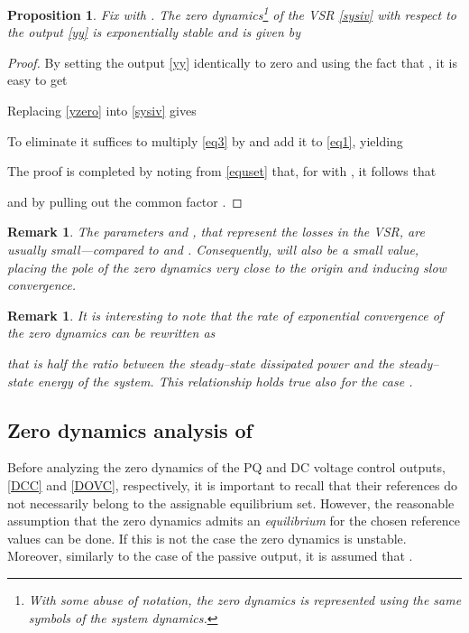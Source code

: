 \documentclass[5p,twocolumn]{elsarticle}
\def\begrem{\begin{remark}\rm}
\def\endrem{\end{remark}}
\newtheorem{proposition}[theorem]{Proposition}
\newtheorem{remark}[theorem]{Remark}
\numberwithin{equation}{section}
\begin{document}
\begin{proposition}\em
\label{zeroprop}
Fix  with . The zero dynamics\footnote{With some abuse of notation, the zero dynamics is represented using the same symbols of the system
dynamics.} of the VSR \eqref{sysiv} with respect to the output \eqref{yy} is {\em exponentially stable} and is given by

\end{proposition}
\begin{proof}
By setting the output \eqref{yy} identically to zero and using  the fact that ,  it is easy to get

Replacing \eqref{yzero} into \eqref{sysiv} gives

To eliminate  it suffices to multiply \eqref{eq3} by  and add it to  \eqref{eq1}, yielding

The proof is completed by noting from \eqref{equset} that, for  with , it follows that

and by pulling out the common factor .
\end{proof}

\begrem
The parameters  and , that represent the losses in the VSR, are usually small---compared to  and . Consequently,  will also be a small value, placing the pole of the zero dynamics
very close to the origin and inducing slow convergence.
\endrem

\begin{remark}\em
It is interesting to note that the rate of exponential convergence of the zero dynamics can be rewritten as


that is half the ratio between the steady--state dissipated power and the steady--state energy of the system. This relationship holds true also for the case .
\end{remark}
\subsection{Zero dynamics analysis of }
\label{zerdyn1}
Before analyzing the zero dynamics of the PQ and DC voltage control outputs,  \eqref{DCC} and  \eqref{DOVC}, respectively, it is important to recall that their references  do not necessarily  belong to the assignable
equilibrium set. However, the reasonable assumption that the zero dynamics admits an {\em equilibrium} for the chosen reference values can be done. If this is not the case the zero dynamics is unstable.
Moreover, similarly to the case of the passive output, it is assumed that .
\end{document}
